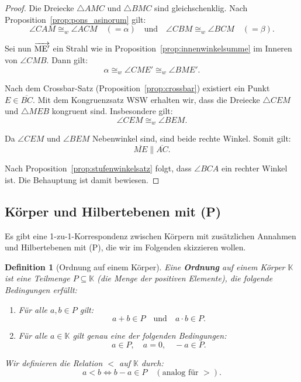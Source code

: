 \documentclass[a4paper,12pt]{article}
\theoremstyle{break}
\newtheorem{definition}{Definition}[section]
\begin{document}
\begin{proof}
Die Dreiecke \(\triangle AMC\) und \(\triangle BMC\) sind gleichschenklig. Nach Proposition~\ref{prop:pons_asinorum} gilt:
\[
\angle CAM \cong_w \angle ACM \quad (= \alpha) \quad \text{und} \quad \angle CBM \cong_w \angle BCM \quad (= \beta).
\]

Sei nun \(\overrightarrow{\rm ME'}\) ein Strahl wie in Proposition~\ref{prop:innenwinkelsumme} im Inneren von \(\angle CMB\). Dann gilt:
\[
\alpha \cong_w \angle CME' \cong_w \angle BME'.
\]

Nach dem Crossbar-Satz (Proposition~\ref{prop:crossbar}) existiert ein Punkt \(E \in \overline{BC}\). Mit dem Kongruenzsatz WSW erhalten wir, dass die Dreiecke \(\triangle CEM\) und \(\triangle MEB\) kongruent sind. Insbesondere gilt:
\[
\angle CEM \cong_w \angle BEM.
\]

Da \(\angle CEM\) und \(\angle BEM\) Nebenwinkel sind, sind beide rechte Winkel. Somit gilt:
\[
\overline{ME} \parallel \overline{AC}.
\]

Nach Proposition~\ref{prop:stufenwinkelsatz} folgt, dass \(\angle BCA\) ein rechter Winkel ist. Die Behauptung ist damit bewiesen.
\end{proof}

\subsection{Körper und Hilbertebenen mit (P)}

Es gibt eine 1-zu-1-Korrespondenz zwischen Körpern mit zusätzlichen Annahmen und Hilbertebenen mit (P), die wir im Folgenden skizzieren wollen.

\begin{definition}[Ordnung auf einem Körper]
Eine \textbf{Ordnung} auf einem Körper \(\mathbb{K}\) ist eine Teilmenge \(P \subseteq \mathbb{K}\) (die Menge der positiven Elemente), die folgende Bedingungen erfüllt:
\begin{enumerate}
    \item Für alle \(a, b \in P\) gilt:
    \[
    a + b \in P \quad \text{und} \quad a \cdot b \in P.
    \]
    \item Für alle \(a \in \mathbb{K}\) gilt genau eine der folgenden Bedingungen:
    \[
    a \in P, \quad a = 0, \quad -a \in P.
    \]
\end{enumerate}
Wir definieren die Relation \(<\) auf \(\mathbb{K}\) durch:
\[
a < b \iff b - a \in P \quad (\text{analog für } >).
\]
\end{definition}
\end{document}
